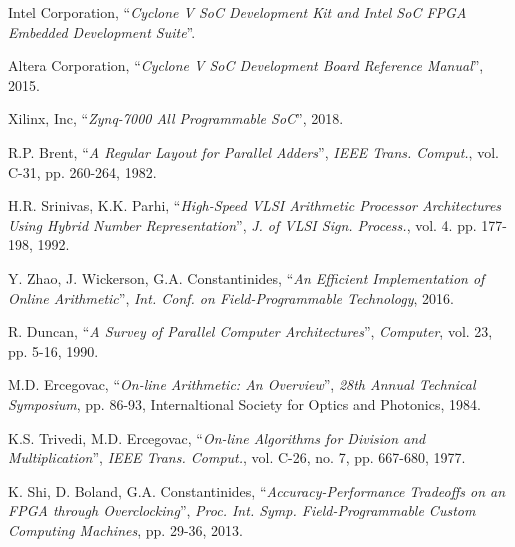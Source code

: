 \documentclass[journal]{IEEEtran}
\begin{document}
\begin{thebibliography}{1}

  Intel Corporation,
  ``\textit{Cyclone V SoC Development Kit and Intel SoC FPGA Embedded
  Development Suite}''.

  Altera Corporation,
  ``\textit{Cyclone V SoC Development Board Reference Manual}'',
  2015.

  Xilinx, Inc,
  ``\textit{Zynq-7000 All Programmable SoC}'',
  2018.

  R.P. Brent,
  ``\textit{A Regular Layout for Parallel Adders}'',
  \textit{IEEE Trans. Comput.}, vol. C-31, pp. 260-264,
  1982.

  H.R. Srinivas, K.K. Parhi,
  ``\textit{High-Speed VLSI Arithmetic Processor Architectures Using Hybrid
  Number Representation}'',
  \textit{J. of VLSI Sign. Process.}, vol. 4. pp. 177-198,
  1992.

  Y. Zhao, J. Wickerson, G.A. Constantinides,
  ``\textit{An Efficient Implementation of Online Arithmetic}'',
  \textit{Int. Conf. on Field-Programmable Technology},
  2016.

  R. Duncan,
  ``\textit{A Survey of Parallel Computer Architectures}'',
  \textit{Computer}, vol. 23, pp. 5-16,
  1990.

  M.D. Ercegovac,
  ``\textit{On-line Arithmetic: An Overview}'',
  \textit{28th Annual Technical Symposium}, pp. 86-93,
  Internaltional Society for Optics and Photonics,
  1984.

  K.S. Trivedi, M.D. Ercegovac,
  ``\textit{On-line Algorithms for Division and Multiplication}'',
  \textit{IEEE Trans. Comput.}, vol. C-26, no. 7, pp. 667-680,
  1977.

  K. Shi, D. Boland, G.A. Constantinides,
  ``\textit{Accuracy-Performance Tradeoffs on an FPGA through Overclocking}'',
  \textit{Proc. Int. Symp. Field-Programmable Custom Computing Machines},
  pp. 29-36,
  2013.


\end{thebibliography}
\end{document}
